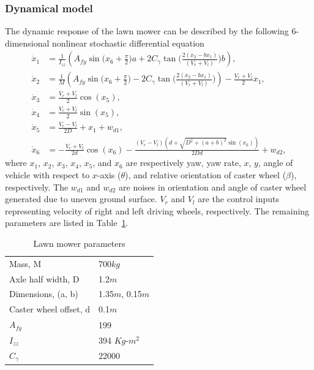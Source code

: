 \subsubsection{Dynamical model}
The dynamic response of the lawn mower can be described by the following 6-dimensional nonlinear stochastic differential equation
\begin{align}
\dot{x}_1 &= \frac{1}{I_{zz}}\left ( A_{fy}\sin\Big ( x_6+\frac{\pi}{2}\Big )a+2C_{\gamma}\tan\Big ( \frac{2(x_2-bx_1)}{(V_r+V_l)}\Big )b \right ),\nonumber\\
\dot{x}_2 &= \frac{1}{M}\left ( A_{fy}\sin\Big ( x_6+\frac{\pi}{2}\Big )-2C_{\gamma}\tan\Big(  \frac{2(x_2-bx_1)}{(V_r+V_l)}\Big )\right )- \frac{V_r+V_l}{2}x_1,\nonumber\\
\dot{x}_3 &= \frac{V_r+V_l}{2}\cos(x_5),\\
\dot{x}_4 &= \frac{V_r+V_l}{2}\sin(x_5),\nonumber\\
\dot{x}_5 &= \frac{V_r-V_l}{2D}+x_1+w_{d1},\nonumber\\
\dot{x}_6 &= -\frac{V_r+V_l}{2d}\cos(x_6)-\frac{(V_r-V_l)(d+\sqrt{D^2+(a+b)^2}\sin(x_6))}{2Dd}+w_{d2},\nonumber
\end{align}
where $x_1$, $x_2$, $x_3$, $x_4$, $x_5$, and $x_6$ are respectively yaw, yaw rate, $x$, $y$, angle of vehicle with respect to $x$-axis ($\theta$), and relative orientation of caster wheel ($\beta$), respectively. The $w_{d1}$ and $w_{d2}$ are noises in orientation and angle of caster wheel generated due to uneven ground surface. $V_r$ and $V_l$ are the control inputs representing velocity of right and left driving wheels, respectively.
The remaining parameters are listed in Table~\ref{table_parameter}.
\begin{table}[]
\centering
\caption{Lawn mower parameters}
\label{table_parameter}
\begin{tabular}{@{}ll@{}}
\toprule
Mass, M                      & 700$kg$                     \\
Axle half width, D                & 1.2$m$                      \\
Dimensions, (a, b)           & 1.35$m$, 0.15$m$                \\
Caster wheel offset, d       & 0.1$m$                        \\
$A_{fy}$                    & 199                         \\
$I_{zz}$                    & 394 $Kg$-$m^2$ \\
$C_{\gamma}$ & 22000                       \\ \bottomrule
\end{tabular}
\end{table}

